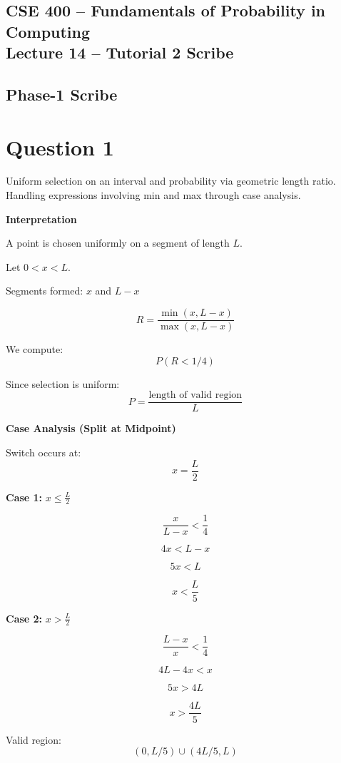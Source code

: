 \documentclass[12pt]{article}
\begin{document}
\begin{center}
\section*{CSE 400 -- Fundamentals of Probability in Computing\\ Lecture 14 -- Tutorial 2 Scribe}
\end{center}

\vspace{2mm}

\subsection*{Phase-1 Scribe}

\section*{Question 1}
Uniform selection on an interval and probability via geometric length ratio. Handling expressions involving min and max through case analysis.

\textbf{Interpretation}

A point is chosen uniformly on a segment of length $L$.  

Let $0 < x < L$.  

Segments formed: $x$ and $L-x$  

\[
R = \frac{\min(x, L-x)}{\max(x, L-x)}
\]

We compute:
\[
P(R < 1/4)
\]

Since selection is uniform:
\[
P = \frac{\text{length of valid region}}{L}
\]

\textbf{Case Analysis (Split at Midpoint)}

Switch occurs at:
\[
x = \frac{L}{2}
\]

\textbf{Case 1:} $x \le \frac{L}{2}$

\[
\frac{x}{L-x} < \frac{1}{4}
\]

\[
4x < L-x
\]

\[
5x < L
\]

\[
x < \frac{L}{5}
\]

\textbf{Case 2:} $x > \frac{L}{2}$

\[
\frac{L-x}{x} < \frac{1}{4}
\]

\[
4L - 4x < x
\]

\[
5x > 4L
\]

\[
x > \frac{4L}{5}
\]

Valid region:
\[
(0, L/5) \cup (4L/5, L)
\]
\end{document}
